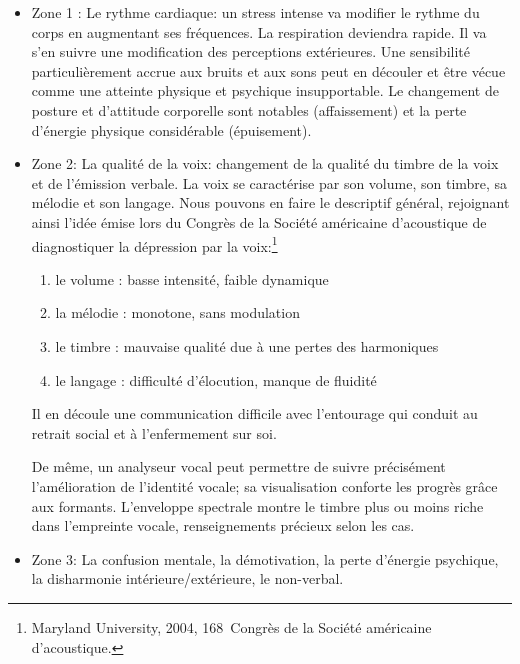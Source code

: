 \begin{itemize}
  	\item Zone 1 :  Le rythme cardiaque: un stress intense va modifier le rythme
  du corps en augmentant ses fréquences. La respiration deviendra
  rapide. Il va s'en suivre une modification des perceptions
  extérieures. Une sensibilité particulièrement accrue aux bruits et
  aux sons peut en découler et être vécue comme une
  atteinte physique et psychique insupportable.
  Le changement de posture et d'attitude corporelle sont
notables (affaissement) et la perte d'énergie physique considérable (épuisement).
	\item Zone 2: La qualité de la voix: changement de la qualité du timbre de la
 voix et de l'émission verbale.
  La voix se caractérise par son volume, son timbre, sa mélodie et son
  langage. Nous pouvons en faire le
        descriptif général, rejoignant ainsi l'idée émise lors du Congrès de la Société
        américaine d'acoustique \autocite{le_service_metronews}
        de diagnostiquer la
        dépression par la voix:\footnote{Maryland University, 2004, 168\ieme\ Congrès de la Société
américaine d'acoustique.}

 	\begin{enumerate}
 		\item le volume : basse intensité, faible dynamique
 		\item la mélodie : monotone, sans modulation
 		\item le timbre : mauvaise qualité due à une pertes des harmoniques
 		\item le langage : difficulté d'élocution, manque de fluidité
 	\end{enumerate}
        Il en découle une communication difficile avec l'entourage qui
        conduit au retrait social et à l'enfermement sur soi.


De même, un analyseur vocal peut permettre de suivre précisément l'amélioration de
l'identité vocale; sa visualisation conforte les progrès grâce aux
formants. L'enveloppe spectrale montre le timbre plus ou moins riche
dans l'empreinte vocale, renseignements précieux selon les cas.

	\item Zone 3: La confusion mentale, la démotivation, la perte d'énergie
psychique, la disharmonie intérieure/extérieure, le non-verbal.
\end{itemize}



